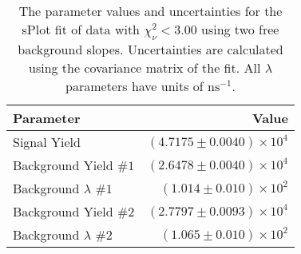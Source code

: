 
\begin{table}[ht]
    \begin{center}
        \begin{tabular}{lr}\toprule
            Parameter & Value \\\midrule
            Signal Yield & $(4.7175 \pm 0.0040) \times 10^{4}$ \\
            Background Yield $\#1$ & $(2.6478 \pm 0.0040) \times 10^{4}$ \\
            Background $\lambda$ $\#1$ & $(1.014 \pm 0.010) \times 10^{2}$ \\
            Background Yield $\#2$ & $(2.7797 \pm 0.0093) \times 10^{4}$ \\
            Background $\lambda$ $\#2$ & $(1.065 \pm 0.010) \times 10^{2}$ \\\bottomrule
        \end{tabular}
        \caption{The parameter values and uncertainties for the sPlot fit of data with $\chi^2_\nu < 3.00$ using two free background slopes. Uncertainties are calculated using the covariance matrix of the fit. All $\lambda$ parameters have units of $\si{\nano\second}^{-1}$.}\label{tab:splot-fit-results-chisqdof-3.00-free-2}
    \end{center}
\end{table}
